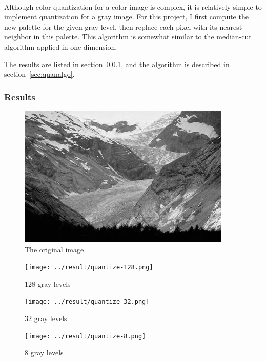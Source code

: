 \documentclass{article}
\begin{document}
\paragraph{}
Although color quantization for a color image is complex, it is relatively simple to implement quantization for a gray image. For this project, I first compute the new palette for the given gray level, then replace each pixel with its nearest neighbor in this palette. This algorithm is somewhat similar to the median-cut algorithm applied in one dimension.

The results are listed in section~\ref{sec:quanresult}, and the algorithm is described in section~\ref{sec:quanalgo}.

\subsubsection{Results}
\label{sec:quanresult}
\begin{figure}[H]
\centering
\includegraphics[width=288pt]{../img/02.png}
\caption{The original image}
\label{quanorigin}
\end{figure}

\begin{figure}[H]
\centering
\texttt{[image: ../result/quantize-128.png]}
\caption{128 gray levels}
\label{quan128}
\end{figure}

\begin{figure}[H]
\centering
\texttt{[image: ../result/quantize-32.png]}
\caption{32 gray levels}
\label{quan32}
\end{figure}

\begin{figure}[H]
\centering
\texttt{[image: ../result/quantize-8.png]}
\caption{8 gray levels}
\label{quan8}
\end{figure}
\end{document}
